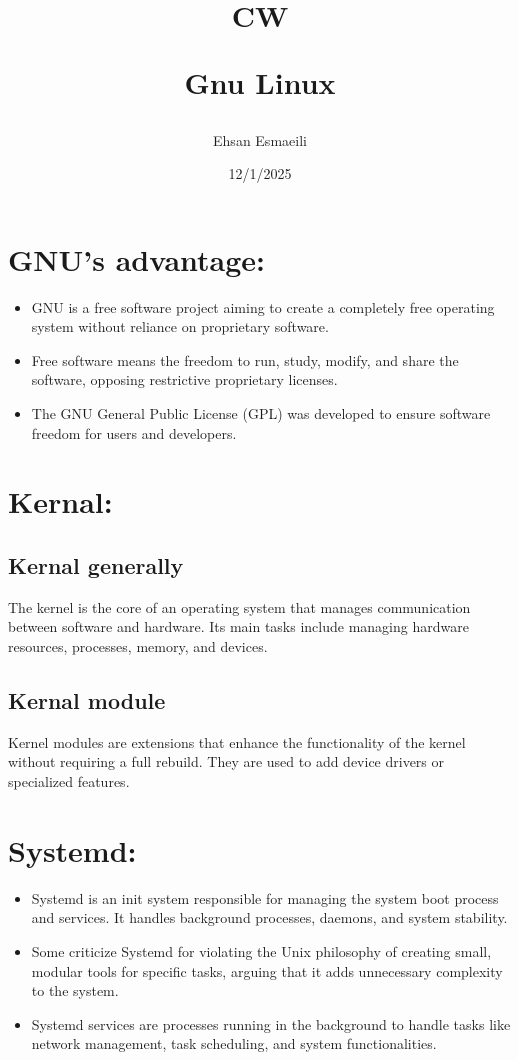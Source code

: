 \documentclass{article}
\title{CW 

Gnu Linux}
\date{12/1/2025}
\author{Ehsan Esmaeili}
\begin{document}
\maketitle
\newpage
\section*{GNU's advantage:}

\begin{itemize}
    \item GNU is a free software project aiming to 
    create a completely free operating system without 
    reliance on proprietary software.
    \item Free software means the freedom 
    to run, study, modify, and share the software, 
    opposing restrictive proprietary licenses.
    \item The GNU General Public License (GPL) was developed 
    to ensure software freedom for users and developers.
\end{itemize}



\section*{Kernal:}

\subsection*{Kernal generally}

The kernel is the core of an operating system 
that manages communication between software and hardware. 
Its main tasks include managing hardware 
resources, processes, memory, and devices.
\subsection*{Kernal module}

Kernel modules are extensions that enhance 
the functionality of the kernel without requiring 
a full rebuild. They are used to add device 
drivers or specialized features.

\section*{Systemd:}

\begin{itemize}
    \item Systemd is an init system responsible for 
    managing the system boot process and services. 
    It handles background processes, daemons, 
    and system stability.
    \item Some criticize Systemd for violating 
    the Unix philosophy of creating small, 
    modular tools for specific tasks, arguing 
    that it adds unnecessary complexity to the system.
    \item Systemd services are processes running in the 
    background to handle tasks like network management, 
    task scheduling, and system functionalities.

    
\end{itemize}
\end{document}
